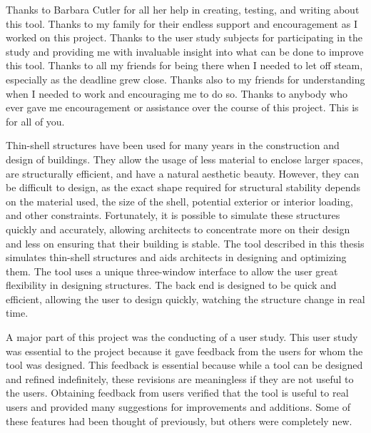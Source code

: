 \documentclass{thesis}
\author{R. Allan Pendergrast}
\begin{document}
 
\titlepage             %
\tableofcontents       %
\listoftables          %
\listoffigures         %

Thanks to Barbara Cutler for all her help in creating, testing, and writing about this tool.  Thanks to my family for their endless
support and encouragement as I worked on this project.  Thanks to the user study subjects for participating in the study and providing
me with invaluable insight into what can be done to improve this tool.  Thanks to all my friends for being there when I needed to let
off steam, especially as the deadline grew close.  Thanks also to my friends for understanding when I needed to work and encouraging
me to do so.  Thanks to anybody who ever gave me encouragement or assistance over the course of this project.  This is for all of you.

Thin-shell structures have been used for many years in the construction and design of buildings.  They allow the usage of less material to enclose
larger spaces, are structurally efficient, and have a natural aesthetic beauty.  However, they can be difficult to design, as the exact shape
required for structural stability depends on the material used, the size of the shell, potential exterior or interior loading, and other constraints.
Fortunately, it is possible to simulate these structures quickly and accurately, allowing architects to concentrate more on their design and
less on ensuring that their building is stable.  The tool described in this thesis simulates thin-shell structures and aids architects in
designing and optimizing them.  The tool uses a unique three-window interface to allow the user great flexibility in designing structures.
The back end is designed to be quick and efficient, allowing the user to design quickly, watching the structure change in real time.

A major part of this project was the conducting of a user study.  This user study was essential to the project because it gave feedback from
the users for whom the tool was designed.  This feedback is essential because while a tool can be designed and refined indefinitely, these
revisions are meaningless if they are not useful to the users.  Obtaining feedback from users verified that the tool is useful to real users
and provided many suggestions for improvements and additions.  Some of these features had been thought of previously, but others were
completely new.
\end{document}
